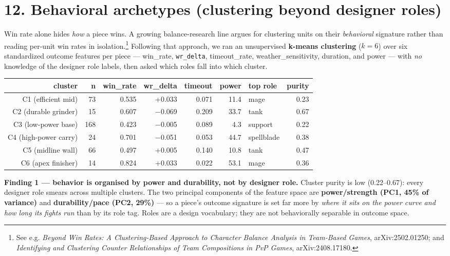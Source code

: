 \documentclass[10pt]{article}
\begin{document}
\section*{12. Behavioral archetypes (clustering beyond designer roles)}

Win rate alone hides \emph{how} a piece wins. A growing balance-research line argues for clustering units on their \emph{behavioral} signature rather than reading per-unit win rates in isolation.\footnote{See e.g. \emph{Beyond Win Rates: A Clustering-Based Approach to Character Balance Analysis in Team-Based Games}, arXiv:2502.01250; and \emph{Identifying and Clustering Counter Relationships of Team Compositions in PvP Games}, arXiv:2408.17180.} Following that approach, we ran an unsupervised \textbf{k-means clustering} ($k{=}6$) over six standardized outcome features per piece --- win\_rate, \texttt{wr\_\allowbreak{}delta}, timeout\_rate, weather\_sensitivity, duration, and power --- with \emph{no} knowledge of the designer role labels, then asked which roles fall into which cluster.\\

\medskip
\begin{tabularx}{\linewidth}{rrrrrrLr}
\toprule
\textbf{cluster} & \textbf{n} & \textbf{win\_rate} & \textbf{wr\_delta} & \textbf{timeout} & \textbf{power} & \textbf{top role} & \textbf{purity} \\
\midrule
C1 (efficient mid) & 73 & 0.535 & +0.033 & 0.071 & 11.4 & mage & 0.23 \\
C2 (durable grinder) & 15 & 0.607 & $-$0.069 & 0.209 & 33.7 & tank & 0.67 \\
C3 (low-power base) & 168 & 0.423 & $-$0.005 & 0.089 & 4.3 & support & 0.22 \\
C4 (high-power carry) & 24 & 0.701 & $-$0.051 & 0.053 & 44.7 & spellblade & 0.38 \\
C5 (midline wall) & 66 & 0.497 & +0.005 & 0.140 & 10.8 & tank & 0.47 \\
C6 (apex finisher) & 14 & 0.824 & +0.033 & 0.022 & 53.1 & mage & 0.36 \\
\bottomrule
\end{tabularx}
\medskip

\textbf{Finding 1 --- behavior is organised by power and durability, not by designer role.} Cluster purity is low (0.22--0.67): every designer role smears across multiple clusters. The two principal components of the feature space are \textbf{power/strength (PC1, 45\% of variance)} and \textbf{durability/pace (PC2, 29\%)} --- so a piece's outcome signature is set far more by \emph{where it sits on the power curve and how long its fights run} than by its role tag. Roles are a design vocabulary; they are not behaviorally separable in outcome space.\\
\end{document}
